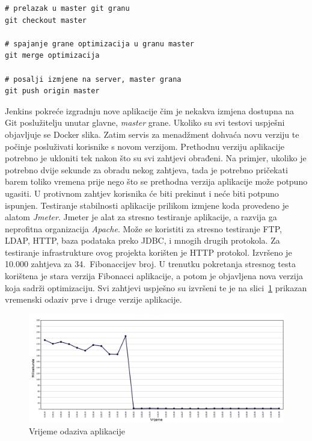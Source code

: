 \begin{lstlisting}[float=h]
# prelazak u master git granu
git checkout master

# spajanje grane optimizacija u granu master
git merge optimizacija

# posalji izmjene na server, master grana
git push origin master
\end{lstlisting}

Jenkins pokreće izgradnju nove aplikacije čim je nekakva izmjena dostupna na Git poslužitelju unutar
glavne, \textit{master} grane. Ukoliko su svi testovi uspješni objavljuje se Docker slika. Zatim
servis za menadžment dohvaća novu verziju te počinje posluživati korisnike s novom verzijom.
Prethodnu verziju aplikacije potrebno je ukloniti tek nakon što su svi zahtjevi obrađeni. Na
primjer, ukoliko je potrebno dvije sekunde za obradu nekog zahtjeva, tada je potrebno pričekati
barem toliko vremena prije nego što se prethodna verzija aplikacije može potpuno ugasiti. U
protivnom zahtjev korisnika će biti prekinut i neće biti potpuno ispunjen. Testiranje stabilnosti
aplikacije prilikom izmjene koda provedeno je alatom \textit{Jmeter}. Jmeter je alat za stresno
testiranje aplikacije, a razvija ga neprofitna organizacija \textit{Apache}. Može se koristiti za
stresno testiranje FTP, LDAP, HTTP, baza podataka preko JDBC, i mnogih drugih protokola. Za
testiranje infrastrukture ovog projekta korišten je HTTP protokol. Izvršeno je 10.000 zahtjeva za
34.~Fibonaccijev broj. U trenutku pokretanja stresnog testa korištena je stara verzija Fibonacci
aplikacije, a potom je objavljena nova verzija koja sadrži optimizaciju. Svi zahtjevi uspješno su
izvršeni te je na slici~\ref{fig:04stresstest} prikazan vremenski odaziv prve i druge verzije
aplikacije.

\begin{figure}[h]
    \centering
    \includegraphics[width=\textwidth]{img/04/response_time.png}
    \caption{Vrijeme odaziva aplikacije}%
    \label{fig:04stresstest}
\end{figure}


